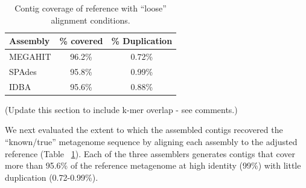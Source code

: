 \documentclass[10pt,a4paper,twocolumn]{article}
\begin{document}



\begin{table}[!h]
\centering
\caption{Contig coverage of reference with ``loose'' alignment conditions.}
\begin{tabular}{|l|c|c|}\hline
\textbf{Assembly} & \textbf{\% covered} & \textbf{\% Duplication}
  \\ \hline
MEGAHIT & 96.2\% & 0.72\% \\ \hline
SPAdes  & 95.8\% & 0.99\% \\ \hline
IDBA    & 95.6\% & 0.88\% \\ \hline
\end{tabular}
\label{table:contig-coverage}
\end{table}

(Update this section to include k-mer overlap - see comments.)


We next evaluated the extent to which the assembled contigs recovered the
``known/true'' metagenome sequence by aligning each assembly to the
adjusted reference (Table ~\ref{table:contig-coverage}).  Each of the three
assemblers generates contigs that cover more than 95.6\% of the reference
metagenome at high identity (99\%) with little duplication
(0.72-0.99\%).


\end{document}
